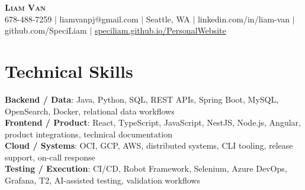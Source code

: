\documentclass[letterpaper,11pt]{article}
\begin{document}

%
\begin{center}
    \textbf{\Huge \scshape Liam Van} \\ \vspace{1pt}
    \small 678-488-7259 $|$ \small {liamvanpj@gmail.com} $|$ Seattle, WA
 {{$|$ linkedin.com/in/liam-van} {$|$ github.com/SpeciLiam} {$|$ \href{https://speciliam.github.io/PersonalWebsite}{speciliam.github.io/PersonalWebsite}}}

\end{center}

\section{Technical Skills}
 \begin{itemize}[leftmargin=0.15in, label={}]
    \small{\item{
     \textbf{Backend / Data}{: Java, Python, SQL, REST APIs, Spring Boot, MySQL, OpenSearch, Docker, relational data workflows} \\
     \textbf{Frontend / Product}{: React, TypeScript, JavaScript, NestJS, Node.js, Angular, product integrations, technical documentation} \\
     \textbf{Cloud / Systems}{: OCI, GCP, AWS, distributed systems, CLI tooling, release support, on-call response} \\
     \textbf{Testing / Execution}{: CI/CD, Robot Framework, Selenium, Azure DevOps, Grafana, T2, AI-assisted testing, validation workflows} \\
    }}
 \end{itemize}
%
\end{document}
